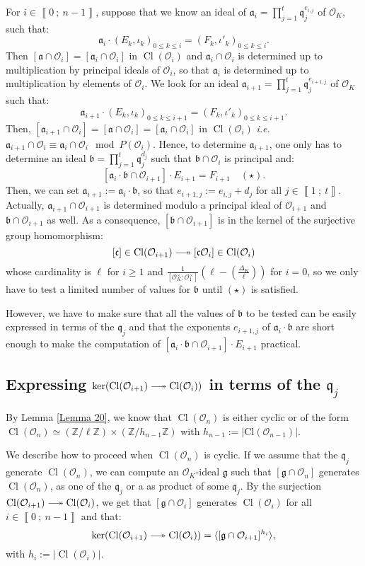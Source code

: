 \documentclass[a4paper,10pt,notitlepage]{report}
\theoremstyle{definition}
\theoremstyle{plain}
\theoremstyle{definition}
\newcommand{\ie}{\emph{i.e.}\ }
\newcommand{\Z}{\mathbb{Z}}
\newcommand{\mO}{\mathcal{O}}
\renewcommand{\i}[2]{\left\llbracket #1~;~#2\right\rrbracket}
\renewcommand{\(}{\left(}
\renewcommand{\)}{\right)}
\newcommand{\mf}[1]{\mathfrak{#1}}
\newcommand{\mfq}{\mathfrak{q}}
\DeclareMathOperator{\Cl}{Cl}
\begin{document}
For $i\in\i{0}{n-1}$, suppose that we know an ideal of $\mf{a}_i=\prod_{j=1}^t \mf{q}_j^{e_{i, j}}$ of $\mO_K$, such that: 
\[\mf{a}_i\cdot(E_k, \iota_k)_{0\leq k\leq i}=(F_k,\iota'_k)_{0\leq k\leq i}.\]
Then $[\mf{a}\cap \mO_i]=[\mf{a}_i\cap\mO_i]$ in $\Cl(\mO_i)$ and $\mf{a}_i\cap \mO_i$ is determined up to multiplication by principal ideals of $\mO_i$, so that $\mf{a}_i$ is determined up to multiplication by elements of $\mO_i$.  We look for an ideal $\mf{a}_{i+1}=\prod_{j=1}^t \mf{q}_j^{e_{i+1, j}}$ of $\mO_K$ such that:
\[\mf{a}_{i+1}\cdot(E_k, \iota_k)_{0\leq k\leq i+1}=(F_k,\iota'_k)_{0\leq k\leq i+1}.\]
Then, $[\mf{a}_{i+1}\cap\mO_{i}]=[\mf{a}\cap \mO_{i}]=[\mf{a}_i\cap\mO_{i}]$ in $\Cl(\mO_{i})$ \ie $\mf{a}_{i+1}\cap\mO_i\equiv \mf{a}_i\cap\mO_i \mod P(\mO_i)$. Hence, to determine $\mf{a}_{i+1}$, one only has to determine an ideal $\mf{b}=\prod_{j=1}^t\mf{q}_j^{d_j}$ such that $\mf{b}\cap\mO_i$ is principal and: 
\[[\mf{a}_i\cdot \mf{b}\cap\mO_{i+1}]\cdot E_{i+1}=F_{i+1} \quad (\star).\]
Then,  we can set $\mf{a}_{i+1}:=\mf{a}_i\cdot \mf{b}$, so that $e_{i+1,j}:=e_{i,j}+d_j$ for all $j\in\i{1}{t}$.  Actually, $\mf{a}_{i+1}\cap\mO_{i+1}$ is determined modulo a principal ideal of $\mO_{i+1}$ and $\mf{b}\cap\mO_{i+1}$ as well. As a consequence,  $[\mf{b}\cap\mO_{i+1}]$ is in the kernel of the surjective group homomorphism:
\[[\mf{c}]\in\Cl(\mO_{i+1})\relbar\joinrel\twoheadrightarrow [\mf{c}\mO_i]\in\Cl(\mO_{i})\]
whose cardinality is $\ell$ for $i\geq 1$ and $\frac{1}{[\mO_K^\times:\mO_1^\times]}\(\ell-\(\frac{\Delta_K}{\ell}\)\)$ for $i=0$, so we only have to test a limited number of values for $\mf{b}$ until $(\star)$ is satisfied.

However, we have to make sure that all the values of $\mf{b}$ to be tested can be easily expressed in terms of the $\mf{q}_j$ and that the exponents $e_{i+1,j}$ of $\mf{a}_i\cdot \mf{b}$ are short enough to make the computation of $[\mf{a}_i\cdot \mf{b}\cap\mO_{i+1}]\cdot E_{i+1}$ practical.  

\subsection{Expressing $\ker(\Cl(\mO_{i+1})\relbar\joinrel\twoheadrightarrow\Cl(\mO_{i}))$ in terms of the $\mfq_j$}

By Lemma \ref{Lemma 20}, we know that $\Cl(\mO_n)$ is either cyclic or of the form $\Cl(\mO_n)\simeq(\Z/\ell\Z)\times(\Z/h_{n-1}\Z)$ with $h_{n-1}:=|\mbox{Cl}(\mO_{n-1})|$.

We describe how to proceed when $\Cl(\mO_n)$ is cyclic. If we assume that the $\mf{q}_j$ generate $\Cl(\mO_n)$, we can compute an $\mO_K$-ideal $\mf{g}$ such that $[\mf{g}\cap\mO_n]$ generates $\Cl(\mO_n)$, as one of the $\mf{q}_j$ or a as product of some $\mf{q}_j$. By the surjection $\Cl(\mO_{i+1})\relbar\joinrel\twoheadrightarrow\Cl(\mO_i)$, we get that $[\mf{g}\cap\mO_i]$ generates $\Cl(\mO_i)$ for all $i\in\i{0}{n-1}$ and that:
\[\ker(\Cl(\mO_{i+1})\relbar\joinrel\twoheadrightarrow\Cl(\mO_{i}))=\langle [\mf{g}\cap\mO_{i+1}]^{h_i}\rangle,\]
with $h_i:=|\Cl(\mO_i)|$. 
\end{document}
